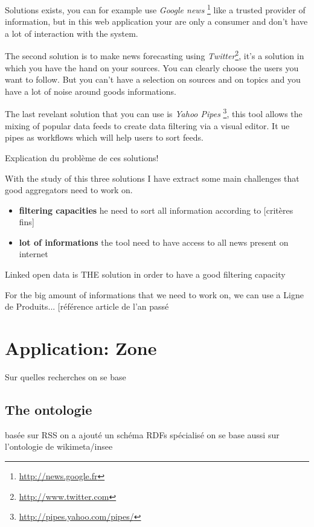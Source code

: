\documentclass{llncs}
\begin{document}
Solutions exists, you can for example use \textsl{Google news} \footnote{\url{http://news.google.fr}} like a trusted provider of information, but in this web application your are only a consumer and don't have a lot of interaction with the system. 

The second solution is to make news forecasting using \textsl{Twitter}\footnote{\url{http://www.twitter.com}}, it's a  solution in which you have the hand on your sources. You can clearly choose the users you want to follow. But you can't have a selection on sources and on topics and you have a lot of noise around goods informations.

The last revelant solution that you can use is \textsl{Yahoo Pipes} \footnote{\url{http://pipes.yahoo.com/pipes/}}, this tool allows the mixing of popular data feeds to create data filtering via a visual editor. It ue pipes as workflows which will help users to sort feeds.

Explication du problème de ces solutions!

With the study of this three solutions I have extract some main challenges that good aggregators need to work on.
\begin{itemize}
  \item \textbf{filtering capacities} he need to sort all information according to [critères fins]
  \item \textbf{lot of informations} the tool need to have access to all news present on internet 
\end{itemize}


Linked open data is THE solution in order to have a good filtering capacity

For the big amount of informations that we need to work on, we can use a Ligne de Produits... [référence article de l'an passé

%



\section{Application: Zone}
%
Sur quelles recherches on se base

%
\subsection{The ontologie}
%
basée sur RSS
on a ajouté un schéma RDFs spécialisé
on se base aussi sur l'ontologie de wikimeta/insee
%
\end{document}
